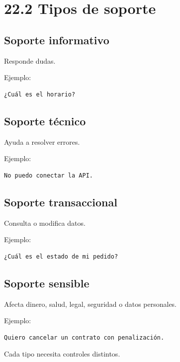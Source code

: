 \section{22.2 Tipos de soporte}\label{tipos-de-soporte}

\subsection{Soporte informativo}\label{soporte-informativo}

Responde dudas.

Ejemplo:

\begin{lstlisting}
¿Cuál es el horario?
\end{lstlisting}

\subsection{Soporte técnico}\label{soporte-tuxe9cnico}

Ayuda a resolver errores.

Ejemplo:

\begin{lstlisting}
No puedo conectar la API.
\end{lstlisting}

\subsection{Soporte transaccional}\label{soporte-transaccional}

Consulta o modifica datos.

Ejemplo:

\begin{lstlisting}
¿Cuál es el estado de mi pedido?
\end{lstlisting}

\subsection{Soporte sensible}\label{soporte-sensible}

Afecta dinero, salud, legal, seguridad o datos personales.

Ejemplo:

\begin{lstlisting}
Quiero cancelar un contrato con penalización.
\end{lstlisting}

Cada tipo necesita controles distintos.

